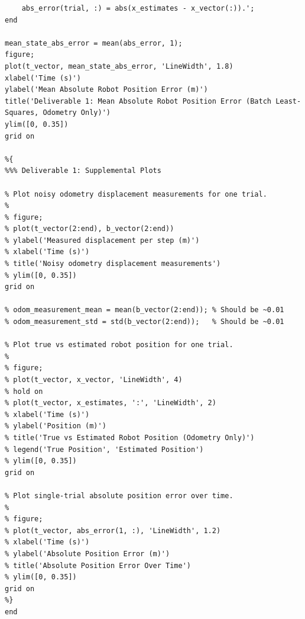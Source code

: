\documentclass[11pt]{article}
\begin{document}
\begin{lstlisting}[caption={sim1.m}, label={lst:sim1}]
    % Store this trial's absolute pose error over time.
    abs_error(trial, :) = abs(x_estimates - x_vector(:)).';
end

mean_state_abs_error = mean(abs_error, 1);
figure;
plot(t_vector, mean_state_abs_error, 'LineWidth', 1.8)
xlabel('Time (s)')
ylabel('Mean Absolute Robot Position Error (m)')
title('Deliverable 1: Mean Absolute Robot Position Error (Batch Least-Squares, Odometry Only)')
ylim([0, 0.35])
grid on

%{
%%% Deliverable 1: Supplemental Plots

% Plot noisy odometry displacement measurements for one trial.
%
% figure;
% plot(t_vector(2:end), b_vector(2:end))
% ylabel('Measured displacement per step (m)')
% xlabel('Time (s)')
% title('Noisy odometry displacement measurements')
% ylim([0, 0.35])
grid on

% odom_measurement_mean = mean(b_vector(2:end)); % Should be ~0.01
% odom_measurement_std = std(b_vector(2:end));   % Should be ~0.01

% Plot true vs estimated robot position for one trial.
%
% figure;
% plot(t_vector, x_vector, 'LineWidth', 4)
% hold on
% plot(t_vector, x_estimates, ':', 'LineWidth', 2)
% xlabel('Time (s)')
% ylabel('Position (m)')
% title('True vs Estimated Robot Position (Odometry Only)')
% legend('True Position', 'Estimated Position')
% ylim([0, 0.35])
grid on

% Plot single-trial absolute position error over time.
%
% figure;
% plot(t_vector, abs_error(1, :), 'LineWidth', 1.2)
% xlabel('Time (s)')
% ylabel('Absolute Position Error (m)')
% title('Absolute Position Error Over Time')
% ylim([0, 0.35])
grid on
%}
end

\end{lstlisting}
\end{document}
